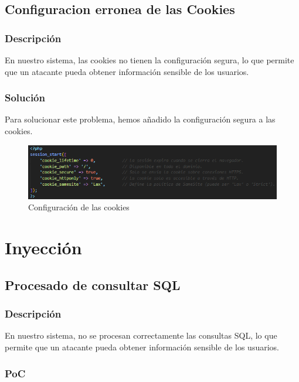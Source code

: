 \documentclass{report}
\begin{document}
            \subsection{Configuracion erronea de las Cookies}
                \subsubsection{Descripción}
                    En nuestro sistema, las cookies no tienen la configuración segura, lo que permite que un atacante pueda obtener información sensible de los usuarios.
                \subsubsection{Solución}
                    Para solucionar este problema, hemos añadido la configuración segura a las cookies.
                    \begin{figure}[H]
                        \centering
                        \includegraphics[width=\textwidth]{./img/vulnerabilidades/3.2.5.1.png}
                        \caption{Configuración de las cookies}
                    \end{figure}
        \clearpage
        \section{Inyección}
            \subsection{Procesado de consultar SQL}
                \subsubsection{Descripción}
                    En nuestro sistema, no se procesan correctamente las consultas SQL, lo que permite que un atacante pueda obtener información sensible de los usuarios.
                \subsubsection{PoC}
\end{document}
